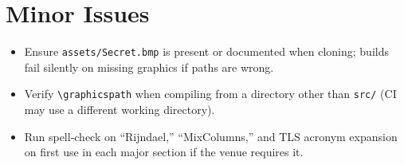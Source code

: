 \section{Minor Issues}
\label{sec:minor-issues}

\begin{itemize}
  \item Ensure \texttt{assets/Secret.bmp} is present or documented when cloning; builds fail silently on missing graphics if paths are wrong.
  \item Verify \texttt{\textbackslash graphicspath} when compiling from a directory other than \texttt{src/} (CI may use a different working directory).
  \item Run spell-check on ``Rijndael,'' ``MixColumns,'' and TLS acronym expansion on first use in each major section if the venue requires it.
\end{itemize}
